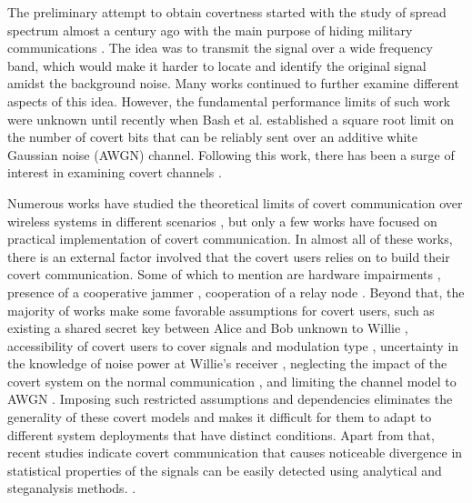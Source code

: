 The preliminary attempt to obtain covertness started with the study of spread spectrum almost a century ago with the main purpose of hiding military communications \cite{scholtz1982origins}. The idea was to transmit the signal over a wide frequency band, which would make it harder to locate and identify the original signal amidst the background noise. Many works continued to further examine different aspects of this idea. However, the fundamental performance limits of such work were unknown until recently when Bash et al. \cite{bash2012square} established a square root limit on the number of covert bits that can be reliably sent over an additive white Gaussian noise (AWGN) channel. Following this work, there has been a surge of interest in examining covert channels \cite{sobers2017covert,soltani2018covert,sheikholeslami2018multi,cao2018wireless}.

Numerous works have studied the theoretical limits of covert communication over wireless systems in different scenarios \cite{bash2012square, soltani2018covert, sheikholeslami2018multi, li2021fundamental}, but only a few works have focused on practical implementation of covert communication. In almost all of these works, there is an external factor involved that the covert users relies on to build their covert communication. Some of which to mention are hardware impairments \cite{mohammed2021adversarial}, presence of a cooperative jammer \cite{sobers2017covert}, cooperation of a relay node \cite{liao2020generative, kim2022covert}. Beyond that, the majority of works make some favorable assumptions for covert users, such as existing a shared secret key between Alice and Bob unknown to Willie \cite{soltani2018covert}, accessibility of covert users to cover signals and modulation type \cite{grzesiak2021wireless}, uncertainty in the knowledge of noise power at Willie's receiver \cite{he2017covert}, neglecting the impact of the covert system on the normal communication \cite{mohammed2021adversarial}, and limiting the channel model to AWGN \cite{mohammed2021adversarial}. Imposing such restricted assumptions and dependencies eliminates the generality of these covert models and makes it difficult for them to adapt to different system deployments that have distinct conditions. Apart from that, recent studies indicate covert communication that causes noticeable divergence in statistical properties of the signals can be easily detected using analytical and steganalysis methods. \cite{bahramali2021robust,huang2020exploiting}.


